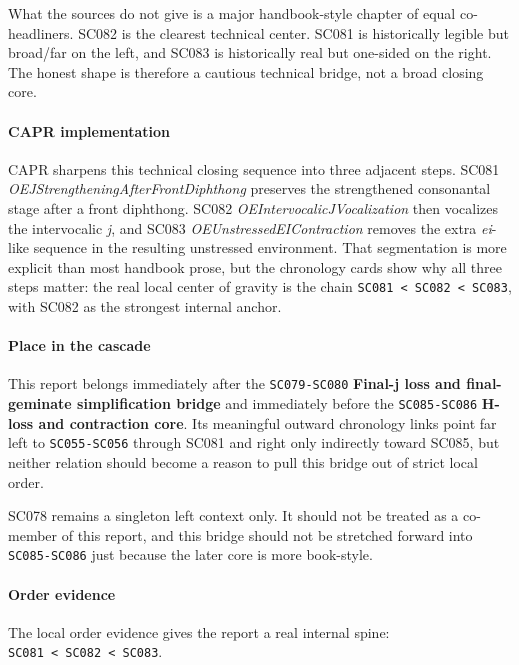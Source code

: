 \documentclass[
  british,
  a4paper,
]{article}
\begin{document}
What the sources do not give is a major handbook-style chapter of equal
co-headliners. SC082 is the clearest technical center. SC081 is
historically legible but broad/far on the left, and SC083 is
historically real but one-sided on the right. The honest shape is
therefore a cautious technical bridge, not a broad closing core.

\paragraph{CAPR implementation}\label{capr-implementation-50}

CAPR sharpens this technical closing sequence into three adjacent steps.
SC081 \emph{OEJStrengtheningAfterFrontDiphthong} preserves the
strengthened consonantal stage after a front diphthong. SC082
\emph{OEIntervocalicJVocalization} then vocalizes the intervocalic
\emph{j}, and SC083 \emph{OEUnstressedEIContraction} removes the extra
\emph{ei}-like sequence in the resulting unstressed environment. That
segmentation is more explicit than most handbook prose, but the
chronology cards show why all three steps matter: the real local center
of gravity is the chain
\texttt{SC081\ \textless{}\ SC082\ \textless{}\ SC083}, with SC082 as
the strongest internal anchor.

\paragraph{Place in the cascade}\label{place-in-the-cascade-50}

This report belongs immediately after the \texttt{SC079-SC080}
\textbf{Final-j loss and final-geminate simplification bridge} and
immediately before the \texttt{SC085-SC086} \textbf{H-loss and
contraction core}. Its meaningful outward chronology links point far
left to \texttt{SC055-SC056} through SC081 and right only indirectly
toward SC085, but neither relation should become a reason to pull this
bridge out of strict local order.

SC078 remains a singleton left context only. It should not be treated as
a co-member of this report, and this bridge should not be stretched
forward into \texttt{SC085-SC086} just because the later core is more
book-style.

\paragraph{Order evidence}\label{order-evidence-50}

The local order evidence gives the report a real internal spine:
\texttt{SC081\ \textless{}\ SC082\ \textless{}\ SC083}.
\end{document}
